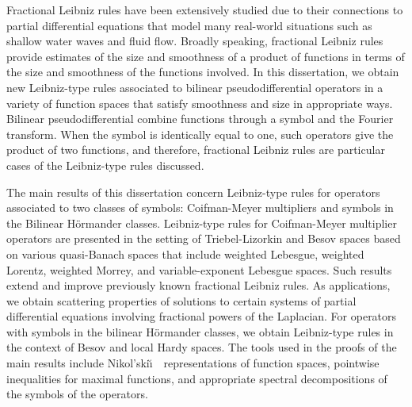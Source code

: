 
\pagestyle{empty}
\setlength{\baselineskip}{0.8cm}



Fractional Leibniz rules have been extensively studied due to their connections to partial
differential equations that model many real-world situations such as shallow water waves
and fluid flow. Broadly speaking, fractional Leibniz rules provide estimates of the size and smoothness of a product of functions in terms of the size and smoothness of the functions involved. In this dissertation, we obtain new Leibniz-type rules associated to bilinear pseudodifferential operators in a variety of function spaces that satisfy smoothness and size in appropriate ways. Bilinear pseudodifferential combine functions through a symbol and the Fourier transform. When the symbol is identically equal to one, such operators give the product of two functions, and therefore, fractional Leibniz rules are particular cases of the Leibniz-type rules discussed.

The main results of this dissertation concern Leibniz-type rules for operators associated to two classes of symbols: Coifman-Meyer multipliers and symbols in the Bilinear H\"ormander classes. Leibniz-type rules for Coifman-Meyer multiplier operators are presented in the setting of Triebel-Lizorkin and Besov spaces based on various quasi-Banach spaces that include weighted Lebesgue, weighted Lorentz, weighted Morrey, and variable-exponent Lebesgue spaces. Such results extend and improve previously known fractional Leibniz rules. As applications, we obtain scattering properties of solutions to certain systems of partial differential equations involving fractional powers of the Laplacian. For operators with symbols in the bilinear H\"ormander classes, we obtain Leibniz-type rules in the context of Besov and local Hardy spaces. The tools used in the proofs of the main results include Nikol'ski\u\i$\text{ }$ representations of function spaces, pointwise inequalities for maximal functions, and appropriate spectral decompositions of the symbols of the operators.